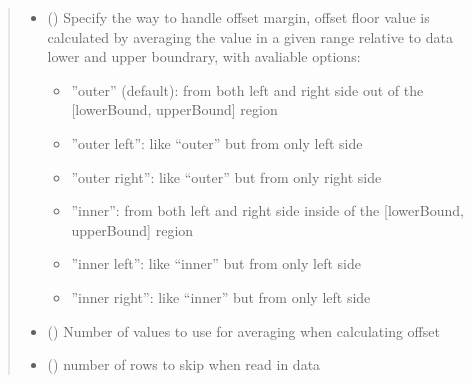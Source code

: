 \documentclass[letterpaper,10pt,english]{sphinxmanual}
\begin{document}
\begin{fulllineitems}
\begin{quote}
\begin{description}
\begin{itemize}
\item {} 
 (\sphinxstyleliteralemphasis{\sphinxupquote{, }}\sphinxstyleliteralemphasis{\sphinxupquote{, }}\sphinxstyleliteralemphasis{\sphinxupquote{, }}\sphinxstyleliteralemphasis{\sphinxupquote{, }}\sphinxstyleliteralemphasis{\sphinxupquote{, }}\sphinxstyleliteralemphasis{\sphinxupquote{, }}) \textendash{} 
Specify the way to handle offset margin, offset floor value is calculated by averaging the
value in a given range relative to data lower and upper boundrary, with avaliable options:
\begin{itemize}
\item {} 
”outer” (default):  from both left and right side out of the {[}lowerBound, upperBound{]} region

\item {} 
”outer left”: like “outer” but from only left side

\item {} 
”outer right”: like “outer” but from only right side

\item {} 
”inner”: from both left and right side inside of the {[}lowerBound, upperBound{]} region

\item {} 
”inner left”: like “inner” but from only left side

\item {} 
”inner right”: like “inner” but from only left side

\end{itemize}


\item {} 
 () \textendash{} Number of values to use for averaging when calculating offset

\item {} 
 () \textendash{} number of rows to skip when read in data


\end{itemize}
\end{description}
\end{quote}
\end{fulllineitems}
\end{document}
